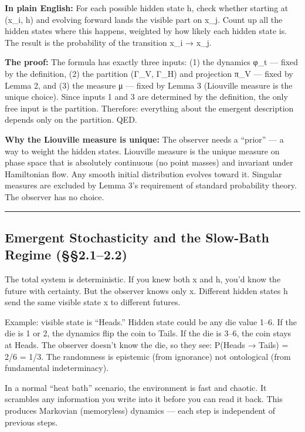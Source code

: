 \documentclass[
]{article}
\begin{document}
\textbf{In plain English:} For each possible hidden state h, check
whether starting at (x\_i, h) and evolving forward lands the visible
part on x\_j. Count up all the hidden states where this happens,
weighted by how likely each hidden state is. The result is the
probability of the transition x\_i → x\_j.

\textbf{The proof:} The formula has exactly three inputs: (1) the
dynamics φ\_t --- fixed by the definition, (2) the partition (Γ\_V,
Γ\_H) and projection π\_V --- fixed by Lemma 2, and (3) the measure μ
--- fixed by Lemma 3 (Liouville measure is the unique choice). Since
inputs 1 and 3 are determined by the definition, the only free input is
the partition. Therefore: everything about the emergent description
depends only on the partition. QED.

\textbf{Why the Liouville measure is unique:} The observer needs a
``prior'' --- a way to weight the hidden states. Liouville measure is
the unique measure on phase space that is absolutely continuous (no
point masses) and invariant under Hamiltonian flow. Any smooth initial
distribution evolves toward it. Singular measures are excluded by Lemma
3's requirement of standard probability theory. The observer has no
choice.

\begin{center}\rule{0.5\linewidth}{0.5pt}\end{center}

\hypertarget{emergent-stochasticity-and-the-slow-bath-regime-2.12.2}{%
\subsection{Emergent Stochasticity and the Slow-Bath Regime
(§§2.1--2.2)}\label{emergent-stochasticity-and-the-slow-bath-regime-2.12.2}}

The total system is deterministic. If you knew both x and h, you'd know
the future with certainty. But the observer knows only x. Different
hidden states h send the same visible state x to different futures.

Example: visible state is ``Heads.'' Hidden state could be any die value
1--6. If the die is 1 or 2, the dynamics flip the coin to Tails. If the
die is 3--6, the coin stays at Heads. The observer doesn't know the die,
so they see: P(Heads → Tails) = 2/6 = 1/3. The randomness is epistemic
(from ignorance) not ontological (from fundamental indeterminacy).

In a normal ``heat bath'' scenario, the environment is fast and chaotic.
It scrambles any information you write into it before you can read it
back. This produces Markovian (memoryless) dynamics --- each step is
independent of previous steps.
\end{document}
